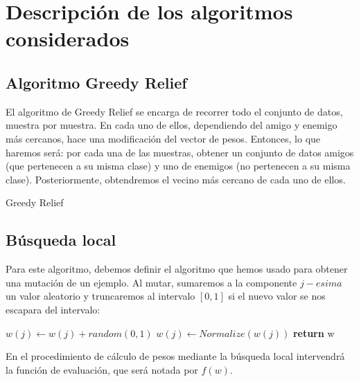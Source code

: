 \documentclass[10pt, a4paper]{article}
\makeatletter
\def\BState{\State\hskip-\ALG@thistlm}
\theoremstyle{theorem-style}
\theoremstyle{theorem-style}
\theoremstyle{theorem2-style}
\theoremstyle{definition-style}
\theoremstyle{remark-style}
\theoremstyle{example-style}
\theoremstyle{definition-style}
\theoremstyle{remark-style}
\theoremstyle{remark-style}
\makeatother
\begin{document}
\section{Descripción de los algoritmos considerados}

\subsection{\textcolor{ugrColor}{Algoritmo Greedy Relief}}
El algoritmo de Greedy Relief se encarga de recorrer todo el conjunto de datos, muestra por muestra. En cada uno de ellos, dependiendo del amigo y enemigo más cercanos, hace una modificación del vector de pesos. Entonces, lo que haremos será: por cada una de las muestras, obtener un conjunto de datos amigos (que pertenecen a su misma clase) y uno de enemigos (no pertenecen a su misma clase). Posteriormente, obtendremos el vecino más cercano de cada uno de ellos. \\

\begin{algorithm}
\caption{Greedy Relief}\label{euclid}
\end{algorithm}

\subsection{\textcolor{ugrColor}{Búsqueda local}}
Para este algoritmo, debemos definir el algoritmo que hemos usado para obtener una mutación de un ejemplo. Al mutar, sumaremos a la componente $j-esima$ un valor aleatorio y truncaremos al intervalo $[0,1]$ si el nuevo valor se nos escapara del intervalo:
\begin{algorithmic}[1]
\State $w(j) \gets w(j) + random(0,1)$
\State $w(j) \gets Normalize(w(j))$
\State \textbf{return} w
\EndProcedure
\end{algorithmic}
En el procedimiento de cálculo de pesos mediante la búsqueda local intervendrá la función de evaluación, que será notada por $f(w)$.
\end{document}
